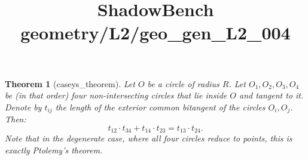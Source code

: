 \documentclass{article}
\title{ShadowBench geometry/L2/geo\_gen\_L2\_004}
\newtheorem{theorem}{Theorem}
\begin{document}
\maketitle

\begin{theorem}[caseys_theorem]\label{thm:casey}
Let $O$ be a circle of radius $R$. Let $O_1, O_2, O_3, O_4$ be (in that order) four non-intersecting circles that lie inside $O$ and tangent to it. Denote by $t_{ij}$ the length of the exterior common bitangent of the circles $O_i, O_j$. Then:
\[
t_{12} \cdot t_{34} + t_{14} \cdot t_{23} = t_{13} \cdot t_{24}.
\]
Note that in the degenerate case, where all four circles reduce to points, this is exactly Ptolemy's theorem.
\end{theorem}
\end{document}
